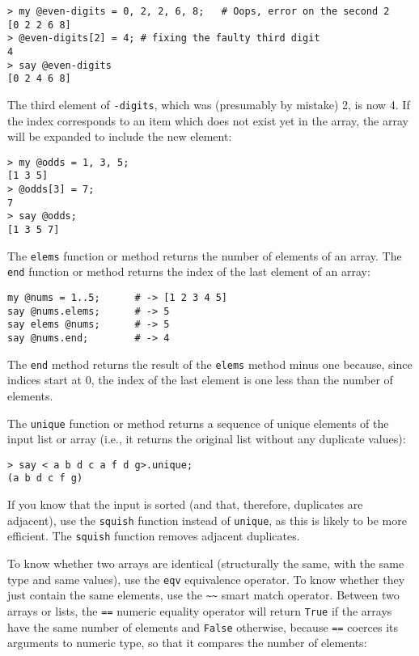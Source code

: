 \begin{verbatim}
> my @even-digits = 0, 2, 2, 6, 8;   # Oops, error on the second 2
[0 2 2 6 8]
> @even-digits[2] = 4; # fixing the faulty third digit
4
> say @even-digits
[0 2 4 6 8]
\end{verbatim}
%

The third element of {\tt \@even-digits}, which was  
(presumably by mistake) 2, is now 4. If the index corresponds 
to an item which does not exist yet in the array, the array 
will be expanded to include the new element:

\begin{verbatim}
> my @odds = 1, 3, 5;
[1 3 5]
> @odds[3] = 7;
7
> say @odds;
[1 3 5 7]
\end{verbatim}


The {\tt elems} function or method returns the number of 
elements of an array. The {\tt end} function or method 
returns the index of the last element of an array:

\begin{verbatim}
my @nums = 1..5;      # -> [1 2 3 4 5]
say @nums.elems;      # -> 5
say elems @nums;      # -> 5
say @nums.end;        # -> 4
\end{verbatim}

The {\tt end} method returns the result of the {\tt elems} 
method minus one because, since indices start at 0, the 
index of the last element is one less than the number 
of elements.

The {\tt unique} function or method returns a sequence 
of unique elements of the input list or array (i.e., 
it returns the original list without any duplicate 
values):

\begin{verbatim}
> say < a b d c a f d g>.unique;
(a b d c f g)
\end{verbatim}

If you know that the input is sorted (and that, therefore, 
duplicates are adjacent), use the {\tt squish} function 
instead of {\tt unique}, as this is likely to be more 
efficient. The {\tt squish} function removes adjacent 
duplicates.

To know whether two arrays are identical (structurally the 
same, with the same type and same values), use the {\tt eqv} equivalence 
operator. To know whether they just contain the same elements, use 
the \verb'~~' smart match operator. Between two arrays or lists, the 
\verb'==' numeric equality operator will return {\tt True} if the 
arrays have the same number of elements and {\tt False} otherwise, 
because \verb'==' coerces its arguments to numeric type, so that 
it compares the number of elements:

